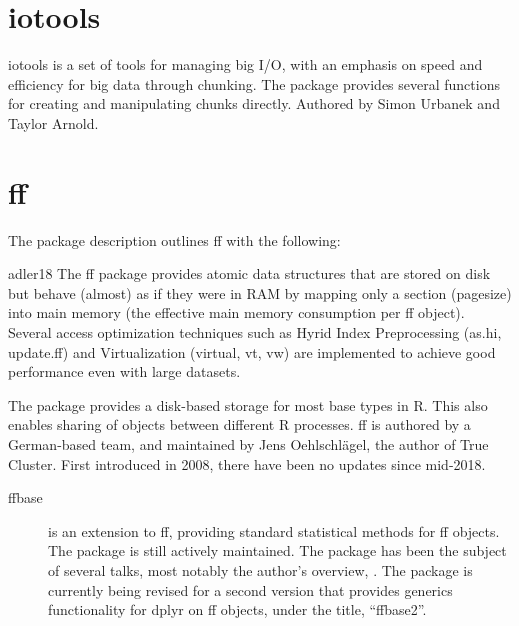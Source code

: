 \documentclass[10pt,a4paper]{article}
\begin{document}
\section{iotools}
\label{sec:iotools}

iotools is a set of tools for managing big I/O, with an emphasis on
speed and efficiency for big data through chunking\cite{urbanek20b}.
The package provides several functions for creating and manipulating
chunks directly. Authored by Simon Urbanek and Taylor Arnold.

\section{ff}
\label{sec:ff}

The package description outlines ff with the following:

\begin{displaycquote}{adler18}
  The ff package provides atomic data structures that are stored on
  disk but behave (almost) as if they were in RAM by mapping only a
  section (pagesize) into main memory (the effective main memory
  consumption per ff object). Several access optimization techniques
  such as Hyrid Index Preprocessing (as.hi, update.ff) and
  Virtualization (virtual, vt, vw) are implemented to achieve good
  performance even with large datasets.
\end{displaycquote}

The package provides a disk-based storage for most base types in R.
This also enables sharing of objects between different R processes. ff
is authored by a German-based team, and maintained by Jens
Oehlschlägel, the author of True Cluster. First introduced in
2008\cite{adler08:_large_r}, there have been no updates since
mid-2018.

\begin{description}
\item[ffbase\cite{jonge20}] is an extension to ff, providing standard
  statistical methods for ff objects. The package is still actively
  maintained. The package has been the subject of several talks, most
  notably the author's overview, \textcite{wijffels13}. The package is
  currently being revised for a second version that provides generics
  functionality for dplyr on ff objects, under the title,
  ``ffbase2''\cite{jonge15}.
\end{description}

\printbibliography{}
\end{document}
